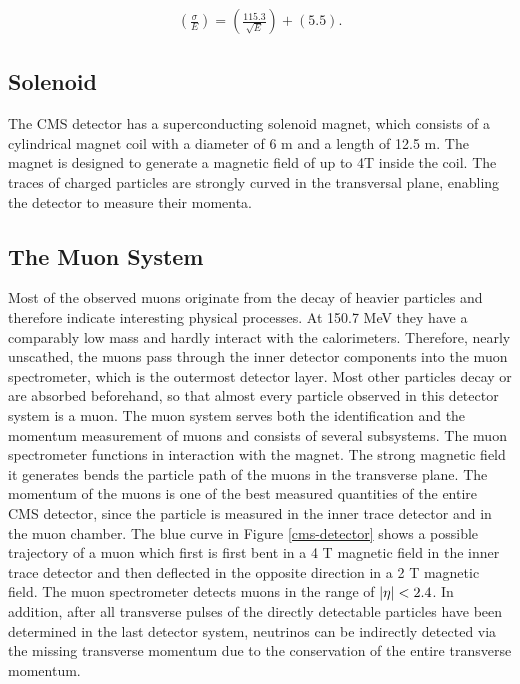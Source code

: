 \documentclass[12pt, a4paper]{thesis}
\begin{document}
\begin{align}
  \left( \frac{\sigma}{E} \right) = \left( \frac{115.3}{\sqrt{E}} \right) + (5.5).
\end{align}

\subsection{Solenoid}
\label{sec:org004c39a}
The CMS detector has a superconducting solenoid magnet, which consists
of a cylindrical magnet coil with a diameter of 6 m and a length of
12.5 m.  The magnet is designed to generate a magnetic field of up to
4T inside the coil. The traces of charged particles are strongly
curved in the transversal plane, enabling the detector to measure
their momenta.

\subsection{The Muon System}
\label{sec:org643030a}

Most of the observed muons originate from the decay of heavier
particles and therefore indicate interesting physical processes. At
150.7 MeV they have a comparably low mass and hardly interact with the
calorimeters.  Therefore, nearly unscathed, the muons pass through the
inner detector components into the muon spectrometer, which is the
outermost detector layer. Most other particles decay or are absorbed
beforehand, so that almost every particle observed in this detector
system is a muon. The muon system serves both the identification and
the momentum measurement of muons and consists of several subsystems.
The muon spectrometer functions in interaction with the magnet. The
strong magnetic field it generates bends the particle path of the
muons in the transverse plane. The momentum of the muons is one of the
best measured quantities of the entire CMS detector, since the
particle is measured in the inner trace detector and in the muon
chamber. The blue curve in Figure \ref{cms-detector} shows a possible
trajectory of a muon which first is first bent in a 4 T magnetic field
in the inner trace detector and then deflected in the opposite
direction in a 2 T magnetic field. The muon spectrometer detects muons
in the range of \(\abs{\eta} < 2.4\). In addition, after all
transverse pulses of the directly detectable particles have been
determined in the last detector system, neutrinos can be indirectly
detected via the missing transverse momentum due to the conservation
of the entire transverse momentum.
\end{document}
